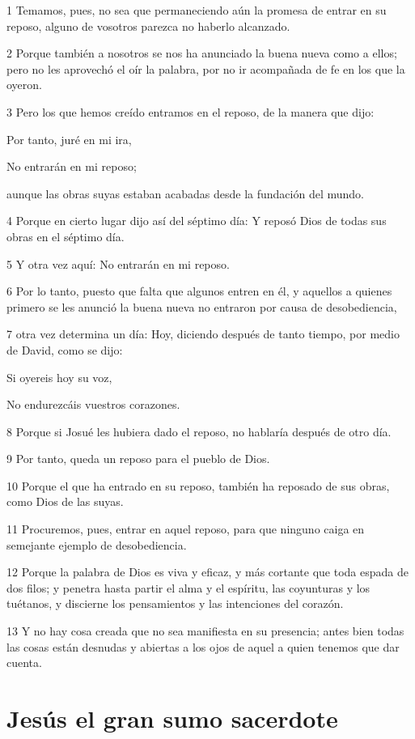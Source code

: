 \par 1 Temamos, pues, no sea que permaneciendo aún la promesa de entrar en su reposo, alguno de vosotros parezca no haberlo alcanzado.
\par 2 Porque también a nosotros se nos ha anunciado la buena nueva como a ellos; pero no les aprovechó el oír la palabra, por no ir acompañada de fe en los que la oyeron.
\par 3 Pero los que hemos creído entramos en el reposo, de la manera que dijo:
\par Por tanto, juré en mi ira,
\par No entrarán en mi reposo;
\par aunque las obras suyas estaban acabadas desde la fundación del mundo.
\par 4 Porque en cierto lugar dijo así del séptimo día: Y reposó Dios de todas sus obras en el séptimo día.
\par 5 Y otra vez aquí: No entrarán en mi reposo.
\par 6 Por lo tanto, puesto que falta que algunos entren en él, y aquellos a quienes primero se les anunció la buena nueva no entraron por causa de desobediencia,
\par 7 otra vez determina un día: Hoy, diciendo después de tanto tiempo, por medio de David, como se dijo:
\par Si oyereis hoy su voz,
\par No endurezcáis vuestros corazones.
\par 8 Porque si Josué les hubiera dado el reposo, no hablaría después de otro día.
\par 9 Por tanto, queda un reposo para el pueblo de Dios.
\par 10 Porque el que ha entrado en su reposo, también ha reposado de sus obras, como Dios de las suyas.
\par 11 Procuremos, pues, entrar en aquel reposo, para que ninguno caiga en semejante ejemplo de desobediencia.
\par 12 Porque la palabra de Dios es viva y eficaz, y más cortante que toda espada de dos filos; y penetra hasta partir el alma y el espíritu, las coyunturas y los tuétanos, y discierne los pensamientos y las intenciones del corazón.
\par 13 Y no hay cosa creada que no sea manifiesta en su presencia; antes bien todas las cosas están desnudas y abiertas a los ojos de aquel a quien tenemos que dar cuenta.

\section*{Jesús el gran sumo sacerdote}

